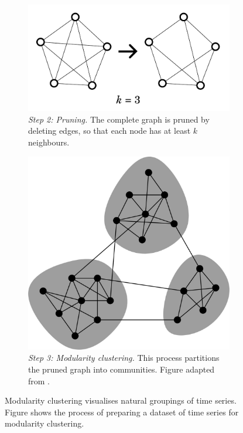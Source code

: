 \begin{figure}
  \begin{subfigure}[t]{0.45\textwidth}
  \centering
    \includegraphics[width=\linewidth]{pruning}
    \caption{
      \emph{Step 2: Pruning.}
      The complete graph is pruned by deleting edges, so that each node has at least $k$ neighbours.
    }
    \label{fig:analysis-clustering-modclust-prune}
  \end{subfigure}%
  \begin{subfigure}[t]{0.45\textwidth}
  \centering
    \includegraphics[width=\linewidth]{newmanModularityCommunityStructure2006_1}
    \caption{
      \emph{Step 3: Modularity clustering.}
      This process partitions the pruned graph into communities.
      Figure adapted from \textcite{newmanModularityCommunityStructure2006}.
    }
    \label{fig:analysis-clustering-modclust-modclust}
  \end{subfigure}

  \caption{
    Modularity clustering visualises natural groupings of time series.
    Figure shows the process of preparing a dataset of time series for modularity clustering.
  }
  \label{fig:analysis-clustering-modclust}
\end{figure}

